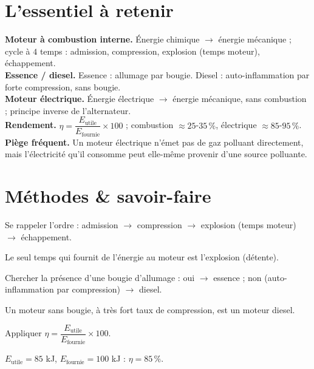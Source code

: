 \section{L'essentiel à retenir}

\begin{synthese}
\textbf{Moteur à combustion interne.} Énergie chimique $\to$ énergie mécanique ; cycle à
$4$ temps : admission, compression, explosion (temps moteur), échappement.\\[4pt]
\textbf{Essence / diesel.} Essence : allumage par bougie. Diesel : auto-inflammation par
forte compression, sans bougie.\\[4pt]
\textbf{Moteur électrique.} Énergie électrique $\to$ énergie mécanique, sans combustion ;
principe inverse de l'alternateur.\\[4pt]
\textbf{Rendement.} $\eta=\dfrac{E_{\text{utile}}}{E_{\text{fournie}}}\times100$ ;
combustion $\approx25$-$35\,\%$, électrique $\approx85$-$95\,\%$.\\[4pt]
\textbf{Piège fréquent.} Un moteur électrique n'émet pas de gaz polluant directement,
mais l'électricité qu'il consomme peut elle-même provenir d'une source polluante.
\end{synthese}

\section{Méthodes \& savoir-faire}

Se rappeler l'ordre : admission $\to$ compression $\to$ explosion (temps moteur) $\to$
échappement.
\begin{exemple}
Le seul temps qui fournit de l'énergie au moteur est l'explosion (détente).
\end{exemple}

Chercher la présence d'une bougie d'allumage : oui $\to$ essence ; non (auto-inflammation
par compression) $\to$ diesel.
\begin{exemple}
Un moteur sans bougie, à très fort taux de compression, est un moteur diesel.
\end{exemple}

Appliquer $\eta=\dfrac{E_{\text{utile}}}{E_{\text{fournie}}}\times100$.
\begin{exemple}
$E_{\text{utile}}=85$ kJ, $E_{\text{fournie}}=100$ kJ : $\eta=85\,\%$.
\end{exemple}


